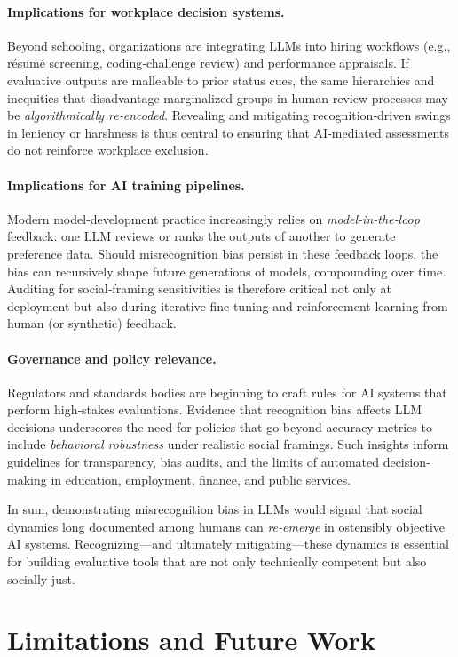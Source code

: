 \documentclass[letterpaper]{article} %
\begin{document}
\paragraph{Implications for workplace decision systems.}
Beyond schooling, organizations are integrating LLMs into hiring workflows (e.g., résumé screening, coding‐challenge review) and performance appraisals.  If evaluative outputs are malleable to prior status cues, the same hierarchies and inequities that disadvantage marginalized groups in human review processes may be \emph{algorithmically re‐encoded}.  Revealing and mitigating recognition‐driven swings in leniency or harshness is thus central to ensuring that AI‐mediated assessments do not reinforce workplace exclusion.

\paragraph{Implications for AI training pipelines.}
Modern model‐development practice increasingly relies on \emph{model‐in‐the‐loop} feedback: one LLM reviews or ranks the outputs of another to generate preference data.  Should misrecognition bias persist in these feedback loops, the bias can recursively shape future generations of models, compounding over time.  Auditing for social‐framing sensitivities is therefore critical not only at deployment but also during iterative fine‐tuning and reinforcement learning from human (or synthetic) feedback.

\paragraph{Governance and policy relevance.}
Regulators and standards bodies are beginning to craft rules for AI systems that perform high‐stakes evaluations.  Evidence that recognition bias affects LLM decisions underscores the need for policies that go beyond accuracy metrics to include \emph{behavioral robustness} under realistic social framings.  Such insights inform guidelines for transparency, bias audits, and the limits of automated decision‐making in education, employment, finance, and public services.

\bigskip
In sum, demonstrating misrecognition bias in LLMs would signal that social dynamics long documented among humans can \emph{re‐emerge} in ostensibly objective AI systems.  Recognizing—and ultimately mitigating—these dynamics is essential for building evaluative tools that are not only technically competent but also socially just.

\section{Limitations and Future Work}


\end{document}
